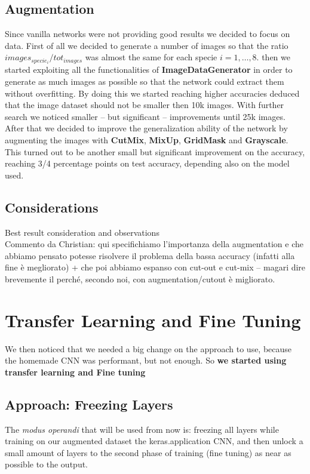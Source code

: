 \documentclass[10pt]{article}
\begin{document}
\subsection{Augmentation}\label{subsec:augmentation}
Since vanilla networks were not providing good results we decided to focus on data.
First of all we decided to generate a number of images so that the ratio $images_{specie_i}/tot_{images}$ was almost the same for each specie $i=1,\dots,8$.
then we started exploiting all the functionalities of \textbf{ImageDataGenerator} in order to generate as much images as possible so that the network could extract them without overfitting.
By doing this we started reaching higher accuracies deduced that the image dataset should not be smaller then 10k images.
With further search we noticed smaller -- but significant -- improvements until 25k images.
After that we decided to improve the generalization ability of the network by augmenting the images with \textbf{CutMix}, \textbf{MixUp}, \textbf{GridMask} and \textbf{Grayscale}.
This turned out to be another small but significant improvement on the accuracy, reaching 3/4 percentage points on test accuracy, depending also on the model used.



\subsection{Considerations}
Best result consideration and observations \\
Commento da Christian: qui specifichiamo l'importanza della augmentation e che abbiamo pensato potesse risolvere il problema della bassa accuracy (infatti alla fine è megliorato) + che poi abbiamo espanso con cut-out e cut-mix -- magari dire brevemente il perché, secondo noi, con augmentation/cutout è migliorato.
\section{Transfer Learning and Fine Tuning}
We then noticed that we needed a big change on the approach to use, because the homemade
CNN was performant, but not enough. So \textbf{we started using transfer learning and Fine tuning}

\subsection{Approach: Freezing Layers}
The \textit{modus operandi} that will be used from now is: freezing all layers while training on our augmented dataset the keras.application
CNN, and then unlock a small amount of layers to the second phase of training (fine tuning) as near as possible to the output.
\end{document}
